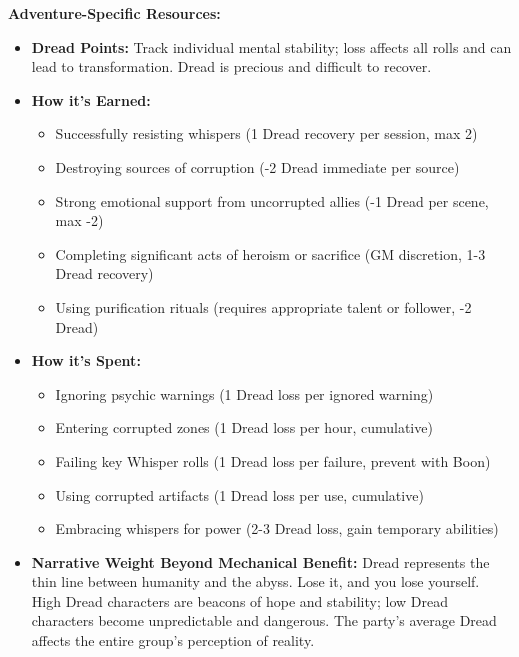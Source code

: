 \documentclass[11pt]{article}
\begin{document}
\textbf{Adventure-Specific Resources:}
\begin{itemize}
\item \textbf{Dread Points:} Track individual mental stability; loss affects all rolls and can lead to transformation. Dread is precious and difficult to recover.
\item \textbf{How it's Earned:}
  \begin{itemize}
  \item Successfully resisting whispers (1 Dread recovery per session, max 2)
  \item Destroying sources of corruption (-2 Dread immediate per source)
  \item Strong emotional support from uncorrupted allies (-1 Dread per scene, max -2)
  \item Completing significant acts of heroism or sacrifice (GM discretion, 1-3 Dread recovery)
  \item Using purification rituals (requires appropriate talent or follower, -2 Dread)
  \end{itemize}
\item \textbf{How it's Spent:}
  \begin{itemize}
  \item Ignoring psychic warnings (1 Dread loss per ignored warning)
  \item Entering corrupted zones (1 Dread loss per hour, cumulative)
  \item Failing key Whisper rolls (1 Dread loss per failure, prevent with Boon)
  \item Using corrupted artifacts (1 Dread loss per use, cumulative)
  \item Embracing whispers for power (2-3 Dread loss, gain temporary abilities)
  \end{itemize}
\item \textbf{Narrative Weight Beyond Mechanical Benefit:} Dread represents the thin line between humanity and the abyss. Lose it, and you lose yourself. High Dread characters are beacons of hope and stability; low Dread characters become unpredictable and dangerous. The party's average Dread affects the entire group's perception of reality.
\end{itemize}
\end{document}
